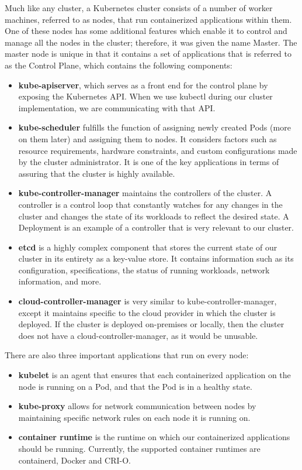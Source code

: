 \documentclass[thesis=B,english]{FITthesis}[2019/12/23]
\begin{document}
Much like any cluster, a Kubernetes cluster consists of a number of worker machines, referred to as nodes, that run containerized applications within them. One of these nodes has some additional features which enable it to control and manage all the nodes in the cluster; therefore, it was given the name Master. The master node is unique in that it contains a set of applications that is referred to as the Control Plane, which contains the following components:

\begin{itemize}
  \setlength\itemsep{0em}
  \item \textbf{kube-apiserver}, which serves as a front end for the control plane by exposing the Kubernetes API. When we use kubectl during our cluster implementation, we are communicating with that API.
  \item \textbf{kube-scheduler} fulfills the function of assigning newly created Pods (more on them later) and assigning them to nodes. It considers factors such as resource requirements, hardware constraints, and custom configurations made by the cluster administrator. It is one of the key applications in terms of assuring that the cluster is highly available.
  \item \textbf{kube-controller-manager} maintains the controllers of the cluster. A controller is a control loop that constantly watches for any changes in the cluster and changes the state of its workloads to reflect the desired state. A Deployment is an example of a controller that is very relevant to our cluster.
  \item \textbf{etcd} is a highly complex component that stores the current state of our cluster in its entirety as a key-value store. It contains information such as its configuration, specifications, the status of running workloads, network information, and more. \cite{etcd}
  \item \textbf{cloud-controller-manager} is very similar to kube-controller-manager, except it maintains specific to the cloud provider in which the cluster is deployed. If the cluster is deployed on-premises or locally, then the cluster does not have a cloud-controller-manager, as it would be unusable.
\end{itemize}

There are also three important applications that run on every node:

\begin{itemize}
  \setlength\itemsep{0em}
  \item \textbf{kubelet} is an agent that ensures that each containerized application on the node is running on a Pod, and that the Pod is in a healthy state.
  \item \textbf{kube-proxy} allows for network communication between nodes by maintaining specific network rules on each node it is running on.
  \item \textbf{container runtime} is the runtime on which our containerized applications should be running. Currently, the supported container runtimes are containerd, Docker and CRI-O.
\end{itemize}
\end{document}

